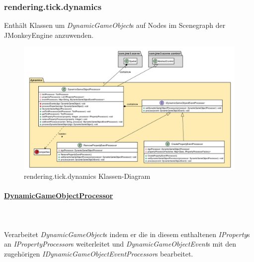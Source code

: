 \subsubsection{rendering.tick.dynamics}
    Enthält Klassen um \textit{DynamicGameObject}s auf Nodes im Scenegraph der JMonkeyEngine anzuwenden.\par

    \begin{figure}[htbp]
        \centering
        \includegraphics[width=\linewidth]{Interface/render-tick-dynamics.png}
        \caption{rendering.tick.dynamics Klassen-Diagram}
    \end{figure}

        \paragraph{\underline{DynamicGameObjectProcessor}} \mbox{}\\
        \\
            Verarbeitet \textit{DynamicGameObject}s indem er die in diesem enthaltenen \textit{IProperty}s an
            \textit{IPropertyProcessor}s weiterleitet und \textit{DynamicGameObjectEvent}s mit den zugehörigen \textit{IDynamicGameObjectEventProcessor}s bearbeitet.\par
                    
